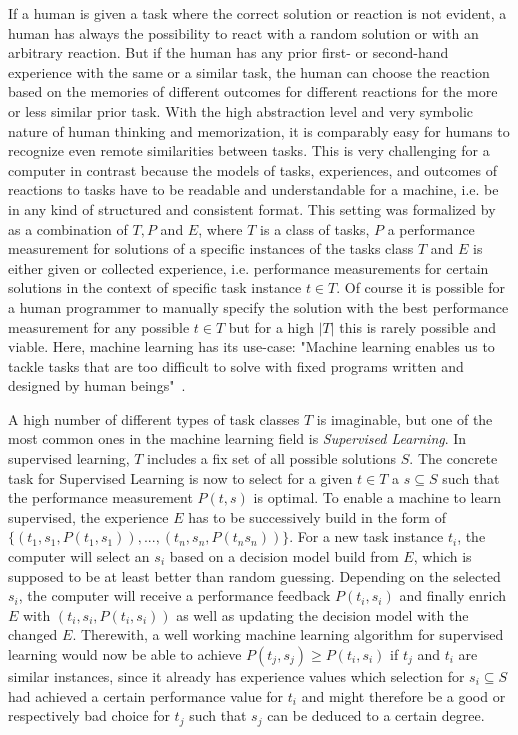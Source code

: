 If a human is given a task where the correct solution or reaction is not evident, a human has always the possibility to react with a random solution or with an arbitrary reaction.
But if the human has any prior first- or second-hand experience with the same or a similar task, the human can choose the reaction based on the memories of different outcomes for different reactions for the more or less similar prior task.
With the high abstraction level and very symbolic nature of human thinking and memorization, it is comparably easy for humans to recognize even remote similarities between tasks.\newline
This is very challenging for a computer in contrast because the models of tasks, experiences, and outcomes of reactions to tasks have to be readable and understandable for a machine, i.e. be in any kind of structured and consistent format.
This setting was formalized by~\textcite{Mitchell-MachineLearning} as a combination of $T, P$ and $E$, where $T$ is a class of tasks, $P$ a performance measurement for solutions of a specific instances of the tasks class $T$ and $E$ is either given or collected experience, i.e. performance measurements for certain solutions in the context of specific task instance $t\in T$.\newline
Of course it is possible for a human programmer to manually specify the solution with the best performance measurement for any possible $t\in T$ but for a high $|T|$ this is rarely possible and viable.
Here, machine learning has its use-case: "Machine learning enables us to tackle tasks that are too difficult to solve with fixed programs written and designed by human beings"~\cite{Goodfellow-DeepLearning}.

A high number of different types of task classes $T$ is imaginable, but one of the most common ones in the machine learning field is \textit{Supervised Learning}.
In supervised learning, $T$ includes a fix set of all possible solutions $S$.
The concrete task for Supervised Learning is now to select for a given $t\in T$ a $s\subseteq S$ such that the performance measurement $P(t,s)$ is optimal.
To enable a machine to learn supervised, the experience $E$ has to be successively build in the form of $\{(t_1, s_1, P(t_1, s_1)), ..., (t_n, s_n, P(t_n s_n))\}$.\newline
For a new task instance $t_i$, the computer will select an $s_i$ based on a decision model build from $E$, which is supposed to be at least better than random guessing.
Depending on the selected $s_i$, the computer will receive a performance feedback $P(t_i, s_i)$ and finally enrich $E$ with $(t_i, s_i, P(t_i, s_i))$ as well as updating the decision model with the changed $E$.
Therewith, a well working machine learning algorithm for supervised learning would now be able to achieve $P(t_j, s_j) \geq P(t_i, s_i)$ if $t_j$ and $t_i$ are similar instances, since it already has experience values which selection for $s_i\subseteq S$ had achieved a certain performance value for $t_i$ and might therefore be a good or respectively bad choice for $t_j$ such that $s_j$ can be deduced to a certain degree.

